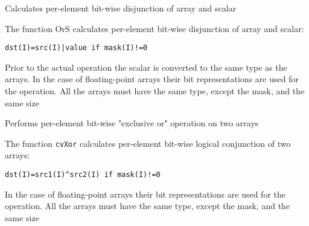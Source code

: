 
Calculates per-element bit-wise disjunction of array and scalar


\begin{description}
\end{description}


The function OrS calculates per-element bit-wise disjunction of array and scalar:

\begin{lstlisting}
dst(I)=src(I)|value if mask(I)!=0
\end{lstlisting}

Prior to the actual operation the scalar is converted to the same type as the arrays. In the case of floating-point arrays their bit representations are used for the operation. All the arrays must have the same type, except the mask, and the same size



Performs per-element bit-wise "exclusive or" operation on two arrays


\begin{description}
\end{description}

The function \texttt{cvXor} calculates per-element bit-wise logical conjunction of two arrays:

\begin{lstlisting}
dst(I)=src1(I)^src2(I) if mask(I)!=0
\end{lstlisting}

In the case of floating-point arrays their bit representations are used for the operation. All the arrays must have the same type, except the mask, and the same size

